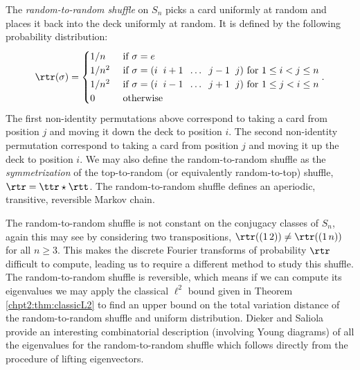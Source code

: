 \documentclass[11pt]{report}
\begin{document}
\begin{defn}
	The \emph{random-to-random shuffle} on $S_{n}$ picks a card 
	uniformly at random and places it back into the deck uniformly at 
	random. It is defined by the 	following probability distribution:
	\begin{eqnarray}
	\rtr(\sigma) = \begin{cases}
	1/n & \textnormal{ if } \sigma = e \\
	1/n^{2} & \textnormal{ if } \sigma = (i \hspace{0.2cm} i+1 \hspace{0.2cm} \dots \hspace{0.2cm} j-1 \hspace{0.2cm} j) \text{ for } 1\leq i < j \leq n  \\
	1/n^{2} & \textnormal{ if } \sigma = (i \hspace{0.2cm} i-1 \hspace{0.2cm} \dots \hspace{0.2cm} j+1 \hspace{0.2cm} j) \text{ for } 1\leq j < i \leq n \\
	0 & \textnormal{ otherwise }
	\end{cases}.
	\end{eqnarray}
	The first non-identity permutations above correspond to taking a card from position $j$ and moving it down the deck to position $i$. The second non-identity permutation correspond to taking a card from position $j$ and moving it up the deck to position $i$.	We may also define the random-to-random shuffle as the \emph{symmetrization} of the top-to-random (or equivalently random-to-top) shuffle, $\rtr = \ttr \star \rtt$. The random-to-random shuffle defines an aperiodic, transitive, reversible Markov chain.
\end{defn}

The random-to-random shuffle is not constant on the conjugacy classes of 
$S_{n}$, again this may see by considering two transpositions, $\rtr ((1 
\, 2) ) \neq \rtr((1 \, n))$ for all $n \geq 3$. 
This makes the discrete Fourier transforms of probability $\rtr$ difficult to compute, leading us to require a different method to study this shuffle.
The random-to-random shuffle is reversible, which means if we can compute its eigenvalues we may apply the classical $\ell^{2}$ 
bound given in Theorem \ref{chpt2:thm:classicL2} to find an upper bound on the total variation distance of the random-to-random shuffle and uniform distribution. 
Dieker and Saliola provide an interesting combinatorial description (involving Young diagrams) of all the eigenvalues for the random-to-random shuffle which follows directly from the procedure of lifting eigenvectors.
\end{document}
